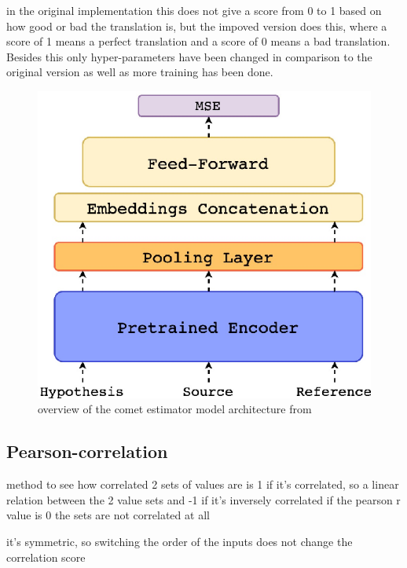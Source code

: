in the original implementation this does not give a score from 0 to 1 based on how good or bad the translation is, but the impoved version does this, where a score of 1 means a perfect translation and a score of 0 means a bad translation. Besides this only hyper-parameters have been changed in comparison to the original version as well as more training has been done.
\begin{figure}[ht]
    \centering
    \includegraphics[width=0.5\linewidth]{Latex//sections//images/cometestimatormodel.png}
    \caption{overview of the comet estimator model architecture from \cite{rei-etal-2020-comet}}
    \label{comet architecture}
\end{figure}


\subsection{Pearson-correlation}
method to see how correlated 2 sets of values are
is 1 if it's correlated, so a linear relation between the 2 value sets and -1 if it's inversely correlated 
if the pearson r value is 0 the sets are not correlated at all

it's symmetric, so switching the order of the inputs does not change the correlation score
